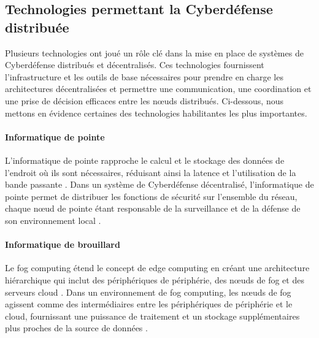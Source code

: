 


\subsection{Technologies permettant la Cyberdéfense distribuée}

Plusieurs technologies ont joué un rôle clé dans la mise en place de systèmes de Cyberdéfense distribués et décentralisés. Ces technologies fournissent l'infrastructure et les outils de base nécessaires pour prendre en charge les architectures décentralisées et permettre une communication, une coordination et une prise de décision efficaces entre les nœuds distribués. Ci-dessous, nous mettons en évidence certaines des technologies habilitantes les plus importantes.

\paragraph{Informatique de pointe}

L'informatique de pointe rapproche le calcul et le stockage des données de l'endroit où ils sont nécessaires, réduisant ainsi la latence et l'utilisation de la bande passante \cite{Shi2016}. Dans un système de Cyberdéfense décentralisé, l'informatique de pointe permet de distribuer les fonctions de sécurité sur l'ensemble du réseau, chaque nœud de pointe étant responsable de la surveillance et de la défense de son environnement local \cite{Roman2018}.

\paragraph{Informatique de brouillard}

Le fog computing étend le concept de edge computing en créant une architecture hiérarchique qui inclut des périphériques de périphérie, des nœuds de fog et des serveurs cloud \cite{Bonomi2012}. Dans un environnement de fog computing, les nœuds de fog agissent comme des intermédiaires entre les périphériques de périphérie et le cloud, fournissant une puissance de traitement et un stockage supplémentaires plus proches de la source de données \cite{Mukherjee2017}.

